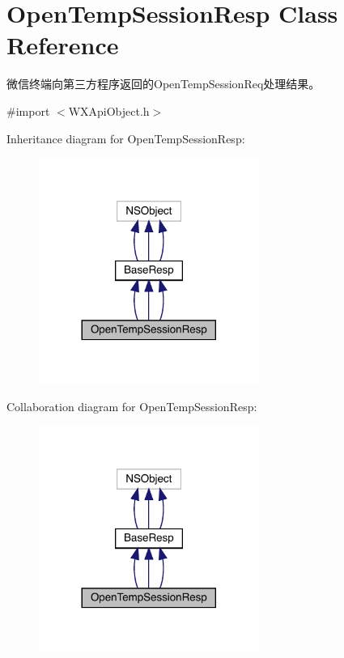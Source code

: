 \hypertarget{interface_open_temp_session_resp}{}\section{Open\+Temp\+Session\+Resp Class Reference}
\label{interface_open_temp_session_resp}


微信终端向第三方程序返回的\+Open\+Temp\+Session\+Req处理结果。  




{\ttfamily \#import $<$W\+X\+Api\+Object.\+h$>$}



Inheritance diagram for Open\+Temp\+Session\+Resp\+:\nopagebreak
\begin{figure}[H]
\begin{center}
\leavevmode
\includegraphics[width=204pt]{interface_open_temp_session_resp__inherit__graph}
\end{center}
\end{figure}


Collaboration diagram for Open\+Temp\+Session\+Resp\+:\nopagebreak
\begin{figure}[H]
\begin{center}
\leavevmode
\includegraphics[width=204pt]{interface_open_temp_session_resp__coll__graph}
\end{center}
\end{figure}
